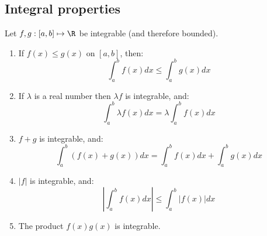 \documentclass[../Main.tex]{subfiles}
\begin{document}
\subsection{Integral properties}
\begin{theorem}
    Let $f, g : [a, b] \mapsto \R$ be integrable (and therefore bounded).
    \begin{enumerate}
        \item If $f(x) \leq g(x)$ on $[a, b]$, then:
	    \begin{equation*}
		\int_a^b f(x) dx \leq \int_a^b g(x) dx
	    \end{equation*}
	\item If $\lambda$ is a real number then $\lambda f$ is integrable, and:
	    \begin{equation*}
		\int_a^b \lambda f(x) dx = \lambda \int_a^b f(x) dx
	    \end{equation*}
	\item $f + g$ is integrable, and:
	    \begin{equation*}
		\int_a^b (f(x) + g(x)) dx = \int_a^b f(x) dx + \int_a^b g(x) dx
	    \end{equation*}
	\item $|f|$ is integrable, and:
	    \begin{equation*}
		\left|\int_a^b f(x) dx\right| \leq \int_a^b |f(x)| dx
	    \end{equation*}
	\item The product $f(x) g(x)$ is integrable.
    \end{enumerate}
\end{theorem}
\end{document}
